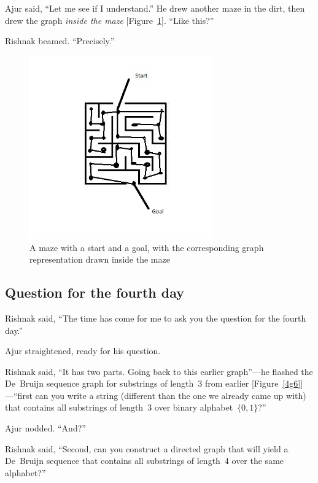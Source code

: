 Ajur said, ``Let me see if I understand.'' He drew another maze in the dirt, then drew the graph \textit{inside the maze} [Figure~\ref{4g9}]. ``Like this?''

Rishnak beamed.  ``Precisely.''

\begin{figure}
\begin{center}
\includegraphics[width=0.7\textwidth]{anothermaze.jpg}
\caption{A maze with a start and a goal, with the corresponding graph representation drawn inside the maze}\label{4g9}
\end{center}
\end{figure}

\subsection*{Question for the fourth day}
Rishnak said, ``The time has come for me to ask you the question for the fourth day.''

Ajur straightened, ready for his question.

Rishnak said, ``It has two parts. Going back to this earlier graph''---he flashed the De~Bruijn sequence graph for substrings of length~3 from earlier [Figure~\ref{4g6}]---``first can you write a string (different than the one we already came up with) that contains all substrings of length~3 over binary alphabet~$\{0,1\}$?''

Ajur nodded.  ``And?''

Rishnak said, ``Second, can you construct a directed graph that will yield a De~Bruijn sequence that contains all substrings of length~4 over the same alphabet?''

